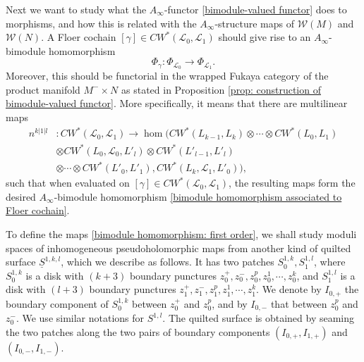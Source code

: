 \documentclass{amsart}
\numberwithin{equation}{section}
\numberwithin{figure}{section}
\begin{document}
	Next we want to study what the $A_{\infty}$-functor \eqref{bimodule-valued functor} does to morphisms, and how this is related with the $A_{\infty}$-structure maps of $\mathcal{W}(M)$ and $\mathcal{W}(N)$. A Floer cochain $[\gamma] \in CW^{*}(\mathcal{L}_{0}, \mathcal{L}_{1})$ should give rise to an $A_{\infty}$-bimodule homomorphism
\begin{equation} \label{bimodule homomorphism associated to Floer cochain}
\Phi_{\gamma}: \Phi_{\mathcal{L}_{0}} \to \Phi_{\mathcal{L}_{1}}.
\end{equation}
Moreover, this should be functorial in the wrapped Fukaya category of the product manifold $M^{-} \times N$ as stated in Proposition \ref{prop: construction  of bimodule-valued functor}.
More specifically, it means that there are multilinear maps
\begin{equation}\label{bimodule homomorphism: first order}
\begin{split}
n^{k|1|l}&: CW^{*}(\mathcal{L}_{0}, \mathcal{L}_{1}) \to \hom(CW^{*}(L_{k-1}, L_{k}) \otimes \cdots \otimes CW^{*}(L_{0}, L_{1})\\
&\otimes CW^{*}(L_{0}, \mathcal{L}_{0}, L'_{l}) \otimes CW^{*}(L'_{l-1}, L'_{l})\\
&\otimes \cdots \otimes CW^{*}(L'_{0}, L'_{1}), CW^{*}(L_{k}, \mathcal{L}_{1}, L'_{0})),
\end{split}
\end{equation} 
such that when evaluated on $[\gamma] \in CW^{*}(\mathcal{L}_{0}, \mathcal{L}_{1})$, the resulting maps form the desired $A_{\infty}$-bimodule homomorphism \eqref{bimodule homomorphism associated to Floer cochain}. \par
	To define the maps \eqref{bimodule homomorphism: first order}, we shall study moduli spaces of inhomogeneous pseudoholomorphic maps from another kind of quilted surface $\underline{S}^{1, k, l}$, which we describe as follows. It has two patches $S^{1, k}_{0}, S^{1, l}_{1}$, where $S^{1, k}_{0}$ is a disk with $(k+3)$ boundary punctures $z_{0}^{+}, z_{0}^{-}, z_{0}^{p}, z_{0}^{1}, \cdots, z_{0}^{k}$, and $S^{1, l}_{1}$ is a disk with $(l+3)$ boundary punctures $z_{1}^{+}, z_{1}^{-}, z_{1}^{p}, z_{1}^{1}, \cdots, z_{1}^{k}$. We denote by $I_{0, +}$ the boundary component of $S^{1, k}_{0}$ between $z_{0}^{+}$ and $z_{0}^{p}$, and by $I_{0, -}$ that between $z_{0}^{p}$ and $z_{0}^{-}$. We use similar notations for $S^{1, l}$. The quilted surface is obtained by seaming the two patches along the two pairs of boundary components $(I_{0, +}, I_{1, +})$ and $(I_{0, -}, I_{1, -})$. \par
\end{document}
